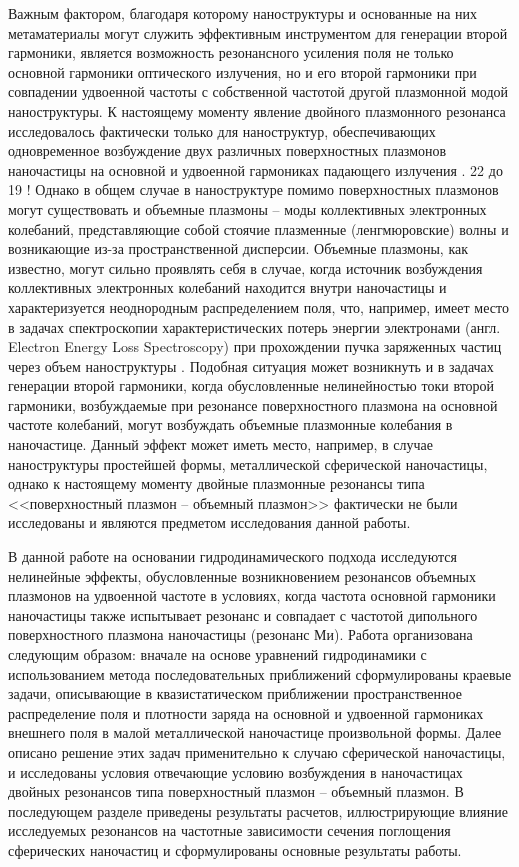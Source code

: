 \documentclass[12pt, a4paper]{article}
\newcommand{\rd}[1]{\color{red} #1 \color{black}}
\begin{document}
Важным фактором, благодаря которому наноструктуры и основанные на них метаматериалы могут служить эффективным инструментом для генерации второй гармоники, является возможность резонансного усиления поля не только основной гармоники оптического излучения, но и его второй гармоники при совпадении удвоенной частоты с собственной частотой другой плазмонной модой наноструктуры. 
К настоящему моменту явление двойного плазмонного резонанса исследовалось фактически только для наноструктур, обеспечивающих одновременное возбуждение двух различных поверхностных плазмонов наночастицы на основной и удвоенной гармониках падающего излучения \cite{Ai2021,Thyagarajan2012}. \rd{22 до 19 !}
Однако в общем случае в наноструктуре помимо поверхностных плазмонов могут существовать и объемные плазмоны \cite{Elibol2022,Gildenburg2016,Ruppin1975,Gildenburg1965} -- моды коллективных электронных колебаний, представляющие собой стоячие плазменные (ленгмюровские) волны и возникающие из-за пространственной дисперсии. 
 Объемные плазмоны, как известно, могут сильно проявлять себя в случае, когда источник возбуждения коллективных электронных колебаний находится внутри наночастицы и характеризуется неоднородным распределением поля, что, например, имеет место в задачах спектроскопии характеристических потерь энергии электронами (англ. Electron Energy Loss Spectroscopy) при прохождении  пучка заряженных частиц через объем наноструктуры
\cite{Gildenburg2016, Kryshtal2025}. 
Подобная ситуация может возникнуть и в задачах генерации второй гармоники, когда обусловленные нелинейностью токи второй гармоники, возбуждаемые при резонансе поверхностного плазмона на основной частоте колебаний, могут возбуждать объемные плазмонные колебания в наночастице. Данный эффект может иметь место, например, в случае наноструктуры простейшей формы, металлической сферической наночастицы, однако к настоящему моменту двойные плазмонные резонансы типа <<поверхностный плазмон -- объемный плазмон>> фактически не были исследованы и являются предметом исследования данной работы.

В данной работе на основании гидродинамического подхода \cite{Haas2011, Boardman1982, Manfredi2021} исследуются нелинейные эффекты, обусловленные возникновением резонансов объемных плазмонов на удвоенной частоте в условиях, когда частота основной гармоники наночастицы также испытывает резонанс и совпадает с частотой дипольного поверхностного плазмона наночастицы (резонанс Ми). Работа организована следующим образом: вначале на основе уравнений гидродинамики с использованием метода последовательных приближений сформулированы краевые задачи, описывающие в квазистатическом приближении пространственное распределение поля и плотности заряда на основной и удвоенной гармониках внешнего поля в малой металлической наночастице произвольной формы. Далее описано решение этих задач применительно к случаю сферической наночастицы, и исследованы условия отвечающие условию возбуждения в наночастицах двойных резонансов типа поверхностный плазмон – объемный плазмон. В последующем разделе приведены результаты расчетов, иллюстрирующие влияние исследуемых резонансов на частотные зависимости сечения поглощения сферических наночастиц и сформулированы основные результаты работы.
\end{document}
